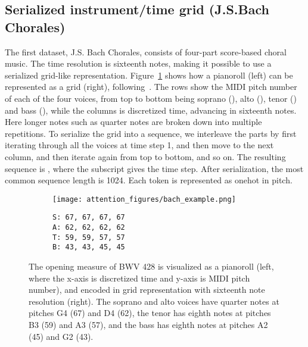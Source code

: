 \documentclass{article} \usepackage{iclr2019_conference,times}
\begin{document}
\subsection{Serialized instrument/time grid (J.S.Bach Chorales)}
\label{sec:bach}
The first dataset, J.S. Bach Chorales, consists of four-part score-based choral music.  The time resolution is sixteenth notes, making it possible to use a serialized grid-like representation.  Figure~\ref{figure:bach} shows how a pianoroll (left) can be represented as a grid (right), following~\citep{huang2017coconet}.  The rows show the MIDI pitch number of each of the four voices, from top to bottom being soprano (), alto (), tenor () and bass (), while the columns is discretized time, advancing in sixteenth notes.  Here longer notes such as quarter notes are broken down into multiple repetitions.  
To serialize the grid into a sequence, we interleave the parts by first iterating through all the voices at time step 1, and then move to the next column, and then iterate again from top to bottom, and so on.  The resulting sequence is , where the subscript gives the time step.  After serialization, the most common sequence length is 1024.  Each token is represented as onehot in pitch.














\begin{figure}[h]
    \centering
    \begin{subfigure}{.5\textwidth}
      \centering
      \texttt{[image: attention\_figures/bach\_example.png]}
    \end{subfigure}\hspace{0.1in}
    \begin{subfigure}{.25\textwidth}
          \footnotesize
          \texttt{S: 67, 67, 67, 67 \\
                  A: 62, 62, 62, 62 \\
                  T: 59, 59, 57, 57 \\
                  B: 43, 43, 45, 45 }
\end{subfigure}
  \caption{The opening measure of BWV 428 is visualized as a pianoroll (left, where the x-axis is discretized time and y-axis is MIDI pitch number), and encoded in grid representation with sixteenth note resolution (right). The soprano and alto voices have quarter notes at pitches G4 (67) and D4 (62), the tenor has eighth notes at pitches B3 (59) and A3 (57), and the bass has eighth notes at pitches A2 (45) and G2 (43).}
\label{figure:bach}
\end{figure}
\end{document}
